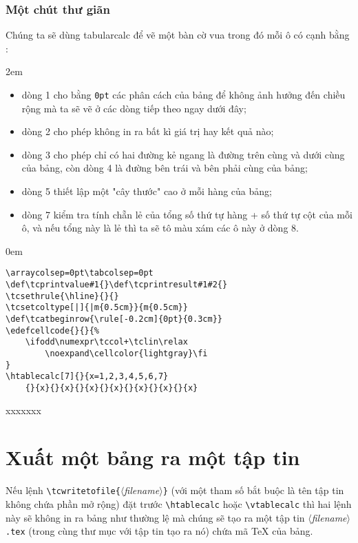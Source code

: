 \documentclass[a4paper,10pt]{article}
\newcommand\argu[1]{$\langle$\textit{#1}$\rangle$}
\newcommand\ARGU[1]{\texttt{\{}\argu{#1}\texttt{\}}}
\newcommand\tbcalc{\textsf{tabularcalc}\xspace}
\newcommand\verbinline{\lstinline[breaklines=false,basicstyle=\normalsize\ttfamily]}
\newcommand\mywidth{0.85\linewidth}
\begin{document}
\subsubsection{Một chút thư giãn}
Chúng ta sẽ dùng \tbcalc để vẽ một bàn cờ vua trong đó mỗi ô có cạnh bằng  :\par\nobreak\parindent2em
\begin{itemize}
	\item dòng 1 cho bằng \verb|0pt| các phân cách của bảng để không ảnh hưởng đến chiều rộng  mà ta sẽ vẽ ở các dòng tiếp theo ngay dưới đây;
	\item dòng 2 cho phép không in ra bất kì giá trị hay kết quả nào;
	\item dòng 3 cho phép chỉ có hai đường kẻ ngang là đường trên cùng và dưới cùng của bảng, còn dòng 4 là đường bên trái và bên phải cùng của bảng;
	\item dòng 5 thiết lập một "cây thước" cao  ở mỗi hàng của bảng;
	\item dòng 7 kiểm tra tính chẵn lẻ của tổng số thứ tự hàng + số thứ tự cột của mỗi ô, và nếu tổng này là lẻ thì ta sẽ tô màu xám các ô này ở dòng 8.
\end{itemize}\parindent0em
\begin{center}
\begin{minipage}{\mywidth}
\begin{lstlisting}
\arraycolsep=0pt\tabcolsep=0pt
\def\tcprintvalue#1{}\def\tcprintresult#1#2{}
\tcsethrule{\hline}{}{}
\tcsetcoltype[|]{|m{0.5cm}}{m{0.5cm}}
\def\tcatbeginrow{\rule[-0.2cm]{0pt}{0.3cm}}
\edefcellcode{}{}{%
	\ifodd\numexpr\tccol+\tclin\relax
		\noexpand\cellcolor{lightgray}\fi
}
\htablecalc[7]{}{x=1,2,3,4,5,6,7}
	{}{x}{}{x}{}{x}{}{x}{}{x}{}{x}{}{x}
\end{lstlisting}
\end{minipage}

\arraycolsep=0pt\tabcolsep=0pt
\def\tcprintvalue#1{}\def\tcprintresult#1#2{}
\tcsethrule{\hline}{}{}
\def\tcatbeginrow{\rule[-0.2cm]{0pt}{0.3cm}}
	{}{x}{}{x}{}{x}{}{x}{}{x}{}{x}{}{x}
\end{center}

\section{Xuất một bảng ra một tập tin}
Nếu lệnh \verbinline=\tcwritetofile=\ARGU{filename} (với một tham số bắt buộc là tên tập tin không chứa phần mở rộng) đặt trước \verbinline=\htablecalc= hoặc \verbinline=\vtablecalc= thì hai lệnh này sẽ không in ra bảng như thường lệ mà chúng sẽ tạo ra một tập tin \argu{filename}\verb|.tex| (trong cùng thư mục với tập tin tạo ra nó) chứa mã \TeX{} của bảng.\medskip
\end{document}
